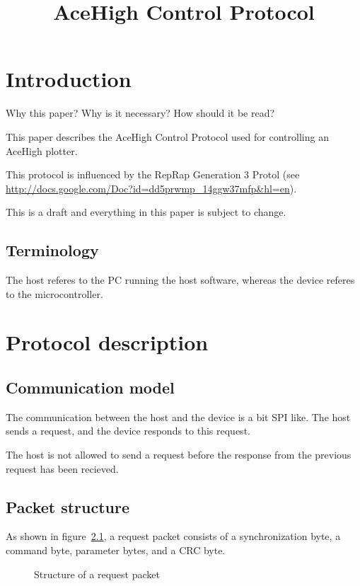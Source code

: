 \documentclass[11pt,a4paper,oneside]{memoir}
\title{AceHigh Control Protocol}
\begin{document}
\maketitle

\tableofcontents*

\chapter{Introduction}

Why this paper? Why is it necessary? How should it be read?

This paper describes the AceHigh Control Protocol used for controlling
an AceHigh plotter.

This protocol is influenced by the RepRap Generation 3 Protol (see
\url{http://docs.google.com/Doc?id=dd5prwmp_14ggw37mfp&hl=en}).

This is a draft and everything in this paper is subject to change.


\section{Terminology}

The host referes to the PC running the host software, whereas the
device referes to the microcontroller.


\chapter{Protocol description}


\section{Communication model}

The communication between the host and the device is a bit SPI
like. The host sends a request, and the device responds to this
request.

The host is not allowed to send a request before the response from the
previous request has been recieved.


\section{Packet structure}

As shown in figure~\ref{fig:request-packet}, a request packet consists
of a synchronization byte, a command byte, parameter bytes, and a CRC
byte.

\begin{figure}[htbp]
  \centering
  \vspace{2cm}
  \caption{Structure of a request packet}
  \label{fig:request-packet}
\end{figure}
\end{document}

